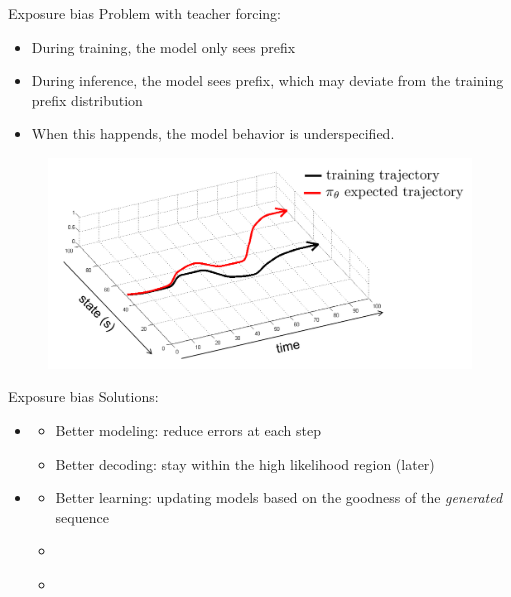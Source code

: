 \documentclass[usenames,dvipsnames,notes,11pt,aspectratio=169,hyperref={colorlinks=true, linkcolor=blue}]{beamer}
\begin{document}
\begin{frame}
    {Exposure bias}
    Problem with teacher forcing:\\
    \begin{itemize}
        \item During training, the model only sees  prefix
        \item During inference, the model sees  prefix, which may deviate from the training prefix distribution
        \item When this happends, the model behavior is underspecified.
    \end{itemize}

    \begin{figure}
        \includegraphics[height=0.5\textheight]{figures/exposure}
    \end{figure}
\end{frame}

\begin{frame}
    {Exposure bias}
    Solutions:\\
    \begin{itemize}
        \item {}
            \begin{itemize}
                \item Better modeling: reduce errors at each step
                \item Better decoding: stay within the high likelihood region (later)
            \end{itemize}
        \pause
    \item {} %
            \begin{itemize}
                \item Better learning: updating models based on the goodness of the {\em generated} sequence
                    \pause
                \item[] {\em{}}
                \item[] {\em{}}
            \end{itemize}
    \end{itemize}
\end{frame}
\end{document}
